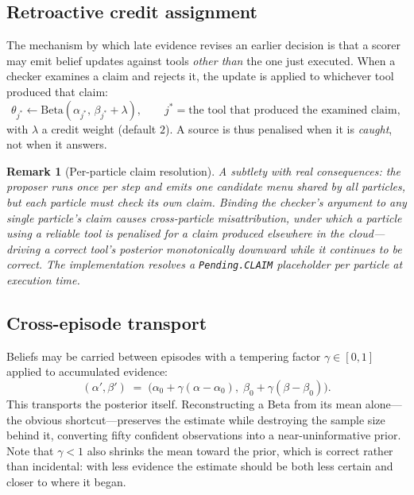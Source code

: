 \documentclass[11pt,a4paper]{article}
\newtheorem{remark}{Remark}
\begin{document}
\subsection{Retroactive credit assignment}

The mechanism by which late evidence revises an earlier decision is that a
scorer may emit belief updates against tools \emph{other than} the one just
executed. When a checker examines a claim and rejects it, the update is applied
to whichever tool produced that claim:
\begin{equation}
\theta_{j^\ast} \leftarrow \mathrm{Beta}(\alpha_{j^\ast},\, \beta_{j^\ast} + \lambda),
\qquad
j^\ast = \text{the tool that produced the examined claim},
\end{equation}
with $\lambda$ a credit weight (default $2$). A source is thus penalised when
it is \emph{caught}, not when it answers.

\begin{remark}[Per-particle claim resolution]
A subtlety with real consequences: the proposer runs once per step and emits
one candidate menu shared by all particles, but each particle must check
\emph{its own} claim. Binding the checker's argument to any single particle's
claim causes cross-particle misattribution, under which a particle using a
reliable tool is penalised for a claim produced elsewhere in the cloud---
driving a correct tool's posterior monotonically downward while it continues to
be correct. The implementation resolves a \texttt{Pending.CLAIM} placeholder
per particle at execution time.
\end{remark}

\subsection{Cross-episode transport}

Beliefs may be carried between episodes with a tempering factor
$\gamma \in [0,1]$ applied to accumulated evidence:
\begin{equation}
(\alpha', \beta') \;=\; \big(\alpha_0 + \gamma(\alpha - \alpha_0),\;
                             \beta_0 + \gamma(\beta - \beta_0)\big).
\end{equation}
This transports the posterior itself. Reconstructing a Beta from its mean
alone---the obvious shortcut---preserves the estimate while destroying the
sample size behind it, converting fifty confident observations into a
near-uninformative prior. Note that $\gamma < 1$ also shrinks the mean toward
the prior, which is correct rather than incidental: with less evidence the
estimate should be both less certain and closer to where it began.
\end{document}
